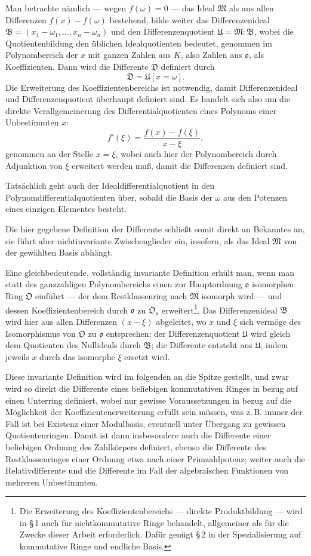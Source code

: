 \documentclass[10pt,a4paper]{article}
\theoremstyle{plain}
\theoremstyle{definition}
\theoremstyle{remark}
\newcommand{\ido}{\mathfrak{o}}
\newcommand{\idD}{\mathfrak{D}}
\newcommand{\idM}{\mathfrak{M}}
\newcommand{\idB}{\mathfrak{B}}
\newcommand{\cO}{\mathfrak{O}}
\begin{document}
Man betrachte n\"amlich --- wegen $f(\omega)=0$ --- das Ideal $\idM$ als aus allen Differenzen $f(x)-f(\omega)$ bestehend, bilde weiter das Differenzenideal $\idB=(x_1-\omega_1,\ldots,x_n-\omega_n)$ und den Differenzenquotient $\mathfrak{U}=\idM:\idB$, wobei die Quotientenbildung den \"ublichen Idealquotienten bedeutet, genommen im Polynombereich der $x$ mit ganzen Zahlen aus $K$, also Zahlen aus $\ido$, als Koeffizienten. Dann wird die Differente $\idD$ definiert durch
\[
\idD = \mathfrak{U}[x=\omega].
\]
Die Erweiterung des Koeffizientenbereichs ist notwendig, damit Differenzenideal und Differenzenquotient \"uberhaupt definiert sind. Es handelt sich also um die direkte Verallgemeinerung des Differentialquotienten eines Polynoms einer Unbestimmten $x$:
\[
f'(\xi) = \frac{f(x)-f(\xi)}{x-\xi},
\]
genommen an der Stelle $x=\xi$, wobei auch hier der Polynombereich durch Adjunktion von $\xi$ erweitert werden mu\ss , damit die Differenzen definiert sind.

Tats\"achlich geht auch der Idealdifferentialquotient in den Polynomdifferentialquotienten \"uber, sobald die Basis der $\omega$ aus den Potenzen eines einzigen Elementes besteht.

Die hier gegebene Definition der Differente schlie\ss t somit direkt an Bekanntes an, sie f\"uhrt aber nichtinvariante Zwischenglieder ein, insofern, als das Ideal $\idM$ von der gew\"ahlten Basis abh\"angt.

Eine gleichbedeutende, vollst\"andig invariante Definition erh\"ult man, wenn man statt des ganzzahligen Polynombereichs einen zur Hauptordnung $\ido$ isomorphen Ring $\cO$ einf\"uhrt --- der dem Restklassenring nach $\idM$ isomorph wird --- und dessen Koeffizientenbereich durch $\ido$ zu $\cO_{\ido}$ erweitert\footnote{Die Erweiterung des Koeffizientenbereichs --- direkte Produktbildung --- wird in \S\,1 auch f\"ur nichtkommutative Ringe behandelt, allgemeiner als f\"ur die Zwecke dieser Arbeit erforderlich. Daf\"ur gen\"ugt \S\,2 in der Spezialisierung auf kommutative Ringe und endliche Basis.}. Das Differenzenideal $\idB$ wird hier aus allen Differenzen $(x-\xi)$ abgeleitet, wo $x$ und $\xi$ sich verm\"oge des Isomorphismus von $\cO$ zu $\ido$ entsprechen; der Differenzenquotient $\mathfrak{U}$ wird gleich dem Quotienten des Nullideals durch $\idB$; die Differente entsteht aus $\mathfrak{U}$, indem jeweils $x$ durch das isomorphe $\xi$ ersetzt wird.

Diese invariante Definition wird im folgenden an die Spitze gestellt, und zwar wird so direkt die Differente eines beliebigen kommutativen Ringes in bezug auf einen Unterring definiert, wobei nur gewisse Voraussetzungen in bezug auf die M\"oglichkeit der Koeffizientenerweiterung erf\"ullt sein m\"ussen, was z.\,B. immer der Fall ist bei Existenz einer Modulbasis, eventuell unter \"Ubergang zu gewissen Quotientenringen. Damit ist dann insbesondere auch die Differente einer beliebigen Ordnung des Zahlk\"orpers definiert, ebenso die Differente des Restklassenringes einer Ordnung etwa nach einer Primzahlpotenz; weiter auch die Relativdifferente und die Differente im Fall der algebraischen Funktionen von mehreren Unbestimmten.
\end{document}
